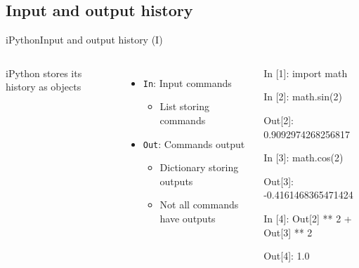 \documentclass[10pt,compress]{beamer} %
\begin{document}
\subsection{Input and output history}
\begin{frame}[fragile]{iPython}{Input and output history (I)}
	\begin{columns}
	iPython stores its history as objects
	\begin{itemize}
		\item \texttt{In}: Input commands
			\begin{itemize}
			\item List storing commands
			\end{itemize}
		\item \texttt{Out}: Commands output
			\begin{itemize}
			\item Dictionary storing outputs
			\item Not all commands have outputs
			\end{itemize}
	\end{itemize}

	\vspace{-0.2cm}

	\begin{exampleblock}{}
In [1]: import math

In [2]: math.sin(2)

Out[2]: 0.9092974268256817

In [3]: math.cos(2)

Out[3]: -0.4161468365471424

In [4]: Out[2] ** 2 + Out[3] ** 2

Out[4]: 1.0
	\end{exampleblock}
	\end{columns}
\end{frame}
\end{document}
